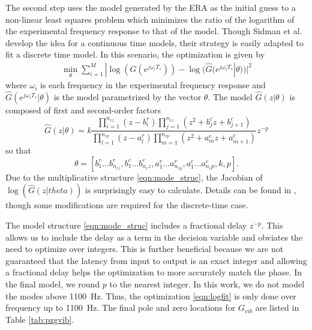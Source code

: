 \documentclass[journal,twocolumn,twoside]{IEEEtran}
\begin{document}
The second step uses the model generated by the ERA as the initial guess to a non-linear least squares problem \cite{sidman_parametric_1991} which minimizes the ratio of the logarithm of the experimental frequency response to that of the model. Though Sidman et al. develop the idea for a continuous time models, their strategy is easily adapted to fit a discrete time model. In this scenario, the optimization is given by
\begin{align}
\min_{\theta} \sum_{i=1}^M| \log(G(e^{j\omega_iT_s})) - \log(\hat{G}(e^{j\omega_iT_s}|\theta))|^2
\label{eqn:logfit}
\end{align}
where $\omega_i$ is each frequency in the experimental frequency response and $\hat{G}(e^{j\omega_iT_s}|\theta)$ is the model parametrized by the vector $\theta$. The model $\hat{G}(z|\theta)$ is composed of first and second-order factors
\begin{equation}
  \hat{G}(z|\theta) =k \frac{\prod_{i=1}^{n_{rz}} (z-b^r_i) \prod_{j=1}^{n_{cz}}(z^2 +b^c_jz + b^c_{j+1})}
  { \prod_{l=1}^{n_{rp}}(z-a^r_l) \prod_{m=1}^{n_{cp}}(z^2 +a^c_mz + a^c_{m+1})}z^{-p} \label{eqn:mode_struc}
\end{equation}
so that
\begin{equation}
\theta = [b^r_1\dots b^r_{n_{rz}}, b^c_{1}\dots b^c_{n_cz}, a^r_1\dots a^r_{n_{rp}}, a^c_{1}\dots a^c_{n_cp}, k, p].
\end{equation}
Due to the multiplicative structure \eqref{eqn:mode_struc}, the Jacobian of $\log(\hat{G}(z|theta))$ is surprisingly easy to calculate. Details can be found in \cite{sidman_parametric_1991}, though some modifications are required for the discrete-time case.

The model structure \eqref{eqn:mode_struc} includes a fractional delay $z^{-p}$. This allows us to include the delay as a term in the decision variable and obviates the need to optimize over integers. This is further beneficial because we are not guaranteed that the latency from input to output is an exact integer and allowing a fractional delay helps the optimization to more accurately match the phase. In the final model, we round $p$ to the nearest integer. In this work, we do not model the modes above 1100~Hz. Thus, the optimization \eqref{eqn:logfit} is only done over frequency up to 1100~Hz. The final pole and zero locations for $G_{vib}$ are listed in Table \ref{tab:pzgvib}.
\end{document}

